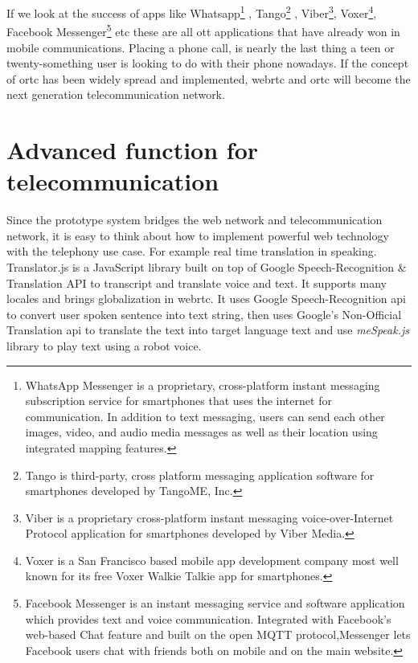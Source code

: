 \par If we look at the success of apps like Whatsapp\footnote{WhatsApp Messenger is a proprietary, cross-platform instant messaging subscription service for smartphones that uses the internet for communication. In addition to text messaging, users can send each other images, video, and audio media messages as well as their location using integrated mapping features.} , Tango\footnote{Tango is third-party, cross platform messaging application software for smartphones developed by TangoME, Inc.} , Viber\footnote{Viber is a proprietary cross-platform instant messaging voice-over-Internet Protocol application for smartphones developed by Viber Media.}, Voxer\footnote{Voxer is a San Francisco based mobile app development company most well known for its free Voxer Walkie Talkie app for smartphones.}, Facebook Messenger\footnote{Facebook Messenger is an instant messaging service and software application which provides text and voice communication. Integrated with Facebook's web-based Chat feature and built on the open MQTT protocol,Messenger lets Facebook users chat with friends both on mobile and on the main website.} etc these are all \gls{ott} applications that have already won in mobile communications. Placing a phone call, is nearly the last thing a teen or twenty-something user is looking to do with their phone nowadays.\cite{web:ott_com} If the concept of \gls{ortc} has been widely spread and implemented, \gls{webrtc} and \gls{ortc} will become the next generation telecommunication network.

\section{Advanced function for telecommunication}

\par Since the prototype system bridges the web network and telecommunication network, it is easy to think about how to implement powerful web technology with the telephony use case. For example real time translation in speaking. Translator.js is a JavaScript library built on top of Google Speech-Recognition \& Translation API to transcript and translate voice and text. It supports many locales and brings globalization in \gls{webrtc}.\cite{github:translatorjs} It uses Google Speech-Recognition \gls{api} to convert user spoken sentence into text string, then uses Google's Non-Official Translation \gls{api} to translate the text into target language text and use \textit{meSpeak.js} library to play text using a robot voice.

